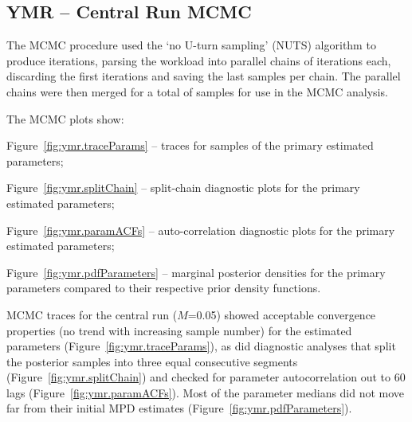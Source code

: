 \documentclass[11pt]{book}
\begin{document}
\graphicspath{{C:/Users/haighr/Files/GFish/PSARC21/YMR/Data/SS/YMR2021/Run75/MPD.75.01/}}
\clearpage

\subsection{YMR -- Central Run MCMC}


The MCMC procedure used the `no U-turn sampling' (NUTS) algorithm \citep{Monnahan-Kristensen:2018, Monnahan-etal:2019} to produce \nSims{} iterations, parsing the workload into \nChains{} parallel chains \citep{R:2015_snowfall} of \cSims{} iterations each, discarding the first \cBurn{} iterations and saving the last \cSamps{} samples per chain.
The parallel chains were then merged for a total of \Nmcmc{} samples for use in the MCMC analysis.

The MCMC plots show:
\vspace{-0.5\baselineskip}%
\begin{itemize_csas}
\item Figure~\ref{fig:ymr.traceParams} -- traces for \Nmcmc{} samples of the primary estimated parameters;
\item Figure~\ref{fig:ymr.splitChain} -- split-chain diagnostic plots for the primary estimated parameters;
\item Figure~\ref{fig:ymr.paramACFs} -- auto-correlation diagnostic plots for the primary estimated parameters;
\item Figure~\ref{fig:ymr.pdfParameters} -- marginal posterior densities for the primary parameters compared to their respective prior density functions.
\end{itemize_csas}

MCMC traces for the central run ($M$=0.05) showed acceptable convergence properties (no trend with increasing sample number) for the estimated parameters (Figure~\ref{fig:ymr.traceParams}), as did diagnostic analyses that split the posterior samples into three equal consecutive segments (Figure~\ref{fig:ymr.splitChain}) and checked for parameter autocorrelation out to 60 lags (Figure~\ref{fig:ymr.paramACFs}).
Most of the parameter medians did not move far from their initial MPD estimates (Figure~\ref{fig:ymr.pdfParameters}).
\end{document}
